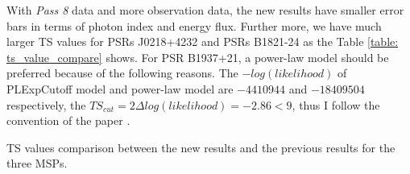\documentclass[12pt]{report}
\newcommand{\mycaption}[1]{\protect \caption{#1}}
\begin{document}
      \begin{table}[!ht]
        \centering 
        \caption{Fit results of power-law model for PSR B1937+21. Since the previous paper 
          does not show the photon flux, I cannot calculate the error bars of photon flux for 
          the previous value.}
        \label{table: final_results_j1939_pl}
      \end{table}

      With \textit{Pass 8} data and more observation data, the new results have smaller error bars
      in terms of photon index and energy flux. Further more, we have much larger TS values for 
      PSRs J0218+4232 and PSRs B1821-24 as the Table \ref{table: ts_value_compare} shows.
      For PSR B1937+21, a power-law model should be preferred because of the following reasons. 
      The $-log(likelihood)$ of PLExpCutoff model and power-law model are $-4410944$ and 
      $-18409504$ respectively, the $TS_{cut} = 2\Delta log(likelihood) = -2.86 < 9$,  thus I 
      follow the convention of the paper \cite{2013ApJS..208...17A}. 

      \begin{table}[!ht]
        \centering
          \mycaption{TS values comparison between the new results and the previous results for 
            the three MSPs. }
          \label{table: ts_value_compare}        
      \end{table}  
    
\end{document}
